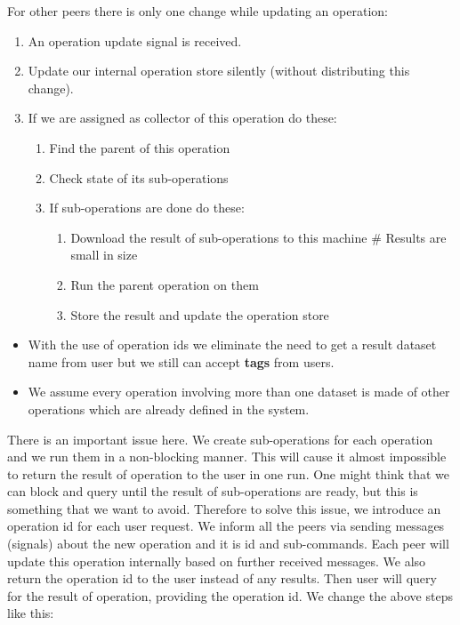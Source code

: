 For other peers there is only one change while updating an operation:
\begin{enumerate}
\item An operation update signal is received.
\item Update our internal operation store silently (without distributing this change).
\item If we are assigned as collector of this operation do these:
  \begin{enumerate}
  \item Find the parent of this operation
  \item Check state of its sub-operations
  \item If sub-operations are done do these:
    \begin{enumerate}
    \item Download the result of sub-operations to this machine \# Results are small in size
    \item Run the parent operation on them
    \item Store the result and update the operation store
    \end{enumerate}
  \end{enumerate}
\end{enumerate}

\begin{itemize}
\item With the use of operation ids we eliminate the need to get a 
result dataset name from user but we still can accept \textbf{tags} from users.
\end{itemize}

\begin{itemize}
\item We assume every operation involving more than one dataset is made of
other operations which are already defined in the system.
\end{itemize}


\iffalse

There is an important issue here. 
We create sub-operations for each operation and we run them in a non-blocking manner.
This will cause it almost impossible to return the result of operation to the user in one run.
One might think that we can block and query until the result of sub-operations are ready,
but this is something that we want to avoid.
Therefore to solve this issue,
we introduce an operation id for each user request.
We inform all the peers via sending messages (signals) about the new operation and it is id and sub-commands. 
Each peer will update this operation internally based on further received messages.
We also return the operation id to the user instead of any results. 
Then user will query for the result of operation, providing the operation id. 
We change the above steps like this:

